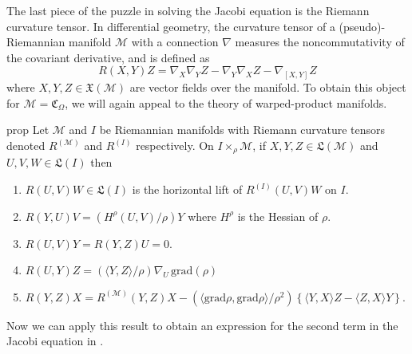 \documentclass{article}
\newcommand{\man}{\mathcal{M}}
\begin{document}
The last piece of the puzzle in solving the Jacobi equation is the Riemann curvature tensor. In differential geometry, the curvature tensor of a (pseudo)-Riemannian manifold $\man$ with a connection $\nabla$ measures the noncommutativity of the covariant derivative, and is defined as
\begin{equation*}
    R(X,Y)Z = \nabla_X \nabla_YZ - \nabla_Y\nabla_XZ - \nabla_{[X,Y]}Z
\end{equation*}
where $X,Y, Z \in \mathfrak{X}(\man)$ are vector fields over the manifold. To obtain this object for $\man = \mathfrak{C}_\Omega$, we will again appeal to the theory of warped-product manifolds. 
\begin{restatable}{prop}{} \label{prop: warped product curvature tensor}
      Let $\man$ and $I$ be Riemannian manifolds with Riemann curvature tensors denoted $R^{(\man)}$ and $R^{(I)}$ respectively. On $I \times_\rho \man$, if $X, Y, Z \in \mathfrak{L}(\man)$ and $U, V, W \in \mathfrak{L}(I)$ then
    \begin{enumerate}
        \item $R(U, V)W \in \mathfrak{L}(I)$ is the horizontal lift of $R^{(I)}(U,V)W$ on $I$.
        \item $R(Y,U)V = (H^\rho(U,V)/\rho)Y$ where $H^\rho$ is the Hessian of $\rho$.
        \item $R(U,V)Y = R(Y,Z)U = 0.$
        \item $R(U,Y)Z = (\langle Y,Z\rangle/\rho)\nabla_U^{}\,\text{grad}(\rho)$\item $R(Y,Z)X =  R^{(\man)}(Y,Z)X - (\langle \text{grad}\rho, \text{grad}\rho\rangle/\rho^2)\left\{\langle Y,X \rangle  Z - \langle Z, X\rangle Y\right\}.$
    \end{enumerate}
\end{restatable}
Now we can apply this result to obtain an expression for the second term in the Jacobi equation in . 
\end{document}
